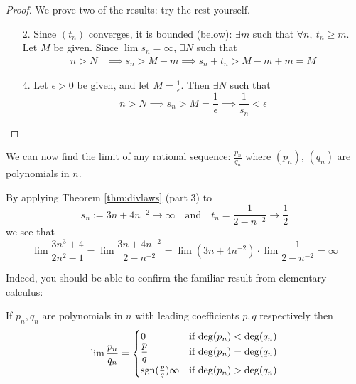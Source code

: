 \begin{proof}
	We prove two of the results: try the rest yourself.
	\begin{enumerate}
		\item[2.] Since $(t_n)$ converges, it is bounded (below): $\exists m$ such that $\forall n,\ t_n\ge m$. Let $M$ be given. Since $\lim s_n=\infty$, $\exists N$ such that
		\begin{align*}
		n>N&\implies s_n>M-m \implies s_n+t_n>M-m+m=M
		\end{align*}
		\item[4.] Let $\epsilon>0$ be given, and let $M=\frac 1\epsilon$. Then $\exists N$ such that
		\[n>N\implies s_n>M=\frac 1\epsilon\implies \frac 1{s_n}<\epsilon\tag*{\qedhere}\]
	\end{enumerate}
\end{proof}


We can now find the limit of any rational sequence: $\frac{p_n}{q_n}$ where $(p_n)$, $(q_n)$ are polynomials in $n$.

\begin{example}{}{}
	By applying Theorem \ref{thm:divlaws} (part 3) to
	\[s_n:=3n+4n^{-2}\to\infty\quad \text{and}\quad t_n=\frac 1{2-n^{-2}}\to\frac 12\]
	we see that
	\[\lim\frac{3n^3+4}{2n^2-1}=\lim\frac{3n+4n^{-2}}{2-n^{-2}}=\lim(3n+4n^{-2})\cdot\lim \frac 1{2-n^{-2}} =\infty\]
\end{example}

Indeed, you should be able to confirm the familiar result from elementary calculus:

\begin{cor}{}{}
	If $p_n,q_n$ are polynomials in $n$ with leading coefficients $p,q$ respectively then
	\[\lim\frac{p_n}{q_n}=\begin{cases}
	0&\text{if $\operatorname{deg}(p_n)<\operatorname{deg}(q_n)$}\\
	\dfrac pq&\text{if $\operatorname{deg}(p_n)=\operatorname{deg}(q_n)$}\\
	\mathrm{sgn}(\frac pq)\infty&\text{if $\operatorname{deg}(p_n)>\operatorname{deg}(q_n)$}
	\end{cases}\]
\end{cor}

\goodbreak


